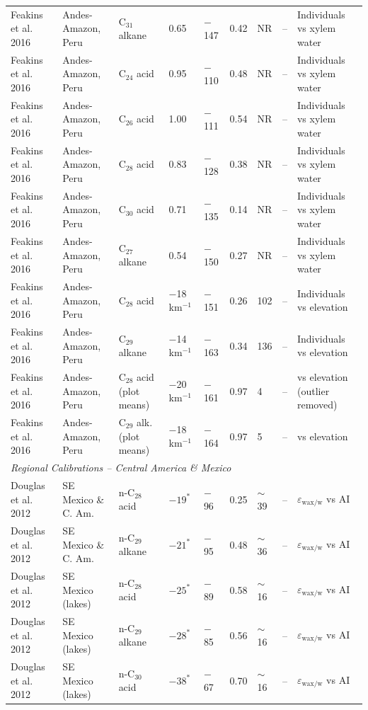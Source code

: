 \documentclass[11pt]{article}
\begin{document}
\begin{longtable}{@{}p{3.5cm}p{3.2cm}p{3.5cm}p{1.5cm}p{1.5cm}p{0.8cm}p{0.9cm}p{1.3cm}p{3.8cm}@{}}
Feakins et al. 2016 & Andes-Amazon, Peru & C$_{31}$ alkane & 0.65 & $-$147 & 0.42 & NR & -- & Individuals vs xylem water \\
Feakins et al. 2016 & Andes-Amazon, Peru & C$_{24}$ acid & 0.95 & $-$110 & 0.48 & NR & -- & Individuals vs xylem water \\
Feakins et al. 2016 & Andes-Amazon, Peru & C$_{26}$ acid & 1.00 & $-$111 & 0.54 & NR & -- & Individuals vs xylem water \\
Feakins et al. 2016 & Andes-Amazon, Peru & C$_{28}$ acid & 0.83 & $-$128 & 0.38 & NR & -- & Individuals vs xylem water \\
Feakins et al. 2016 & Andes-Amazon, Peru & C$_{30}$ acid & 0.71 & $-$135 & 0.14 & NR & -- & Individuals vs xylem water \\
Feakins et al. 2016 & Andes-Amazon, Peru & C$_{27}$ alkane & 0.54 & $-$150 & 0.27 & NR & -- & Individuals vs xylem water \\
Feakins et al. 2016 & Andes-Amazon, Peru & C$_{28}$ acid & $-$18 km$^{-1}$ & $-$151 & 0.26 & 102 & -- & Individuals vs elevation \\
Feakins et al. 2016 & Andes-Amazon, Peru & C$_{29}$ alkane & $-$14 km$^{-1}$ & $-$163 & 0.34 & 136 & -- & Individuals vs elevation \\
Feakins et al. 2016 & Andes-Amazon, Peru & C$_{28}$ acid (plot means) & $-$20 km$^{-1}$ & $-$161 & 0.97 & 4 & -- & vs elevation (outlier removed) \\
Feakins et al. 2016 & Andes-Amazon, Peru & C$_{29}$ alk. (plot means) & $-$18 km$^{-1}$ & $-$164 & 0.97 & 5 & -- & vs elevation \\
\midrule
\multicolumn{9}{l}{\textit{Regional Calibrations -- Central America \& Mexico}} \\
\midrule
Douglas et al. 2012 & SE Mexico \& C. Am. & n-C$_{28}$ acid & $-19^*$ & $-$96 & 0.25 & $\sim$39 & -- & $\varepsilon_{\text{wax/w}}$ vs AI \\
Douglas et al. 2012 & SE Mexico \& C. Am. & n-C$_{29}$ alkane & $-21^*$ & $-$95 & 0.48 & $\sim$36 & -- & $\varepsilon_{\text{wax/w}}$ vs AI \\
Douglas et al. 2012 & SE Mexico (lakes) & n-C$_{28}$ acid & $-25^*$ & $-$89 & 0.58 & $\sim$16 & -- & $\varepsilon_{\text{wax/w}}$ vs AI \\
Douglas et al. 2012 & SE Mexico (lakes) & n-C$_{29}$ alkane & $-28^*$ & $-$85 & 0.56 & $\sim$16 & -- & $\varepsilon_{\text{wax/w}}$ vs AI \\
Douglas et al. 2012 & SE Mexico (lakes) & n-C$_{30}$ acid & $-38^*$ & $-$67 & 0.70 & $\sim$16 & -- & $\varepsilon_{\text{wax/w}}$ vs AI \\

\end{longtable}
\end{document}
